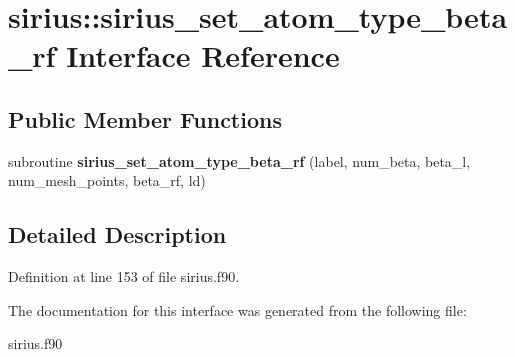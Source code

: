 \hypertarget{interfacesirius_1_1sirius__set__atom__type__beta__rf}{}\section{sirius\+:\+:sirius\+\_\+set\+\_\+atom\+\_\+type\+\_\+beta\+\_\+rf Interface Reference}
\label{interfacesirius_1_1sirius__set__atom__type__beta__rf}
\subsection*{Public Member Functions}
\begin{DoxyCompactItemize}
\item 
\hypertarget{interfacesirius_1_1sirius__set__atom__type__beta__rf_ae92893d780a581bb256bdcf584b95d79}{}subroutine {\bfseries sirius\+\_\+set\+\_\+atom\+\_\+type\+\_\+beta\+\_\+rf} (label, num\+\_\+beta, beta\+\_\+l, num\+\_\+mesh\+\_\+points, beta\+\_\+rf, ld)\label{interfacesirius_1_1sirius__set__atom__type__beta__rf_ae92893d780a581bb256bdcf584b95d79}

\end{DoxyCompactItemize}


\subsection{Detailed Description}


Definition at line 153 of file sirius.\+f90.



The documentation for this interface was generated from the following file\+:\begin{DoxyCompactItemize}
\item 
sirius.\+f90\end{DoxyCompactItemize}
